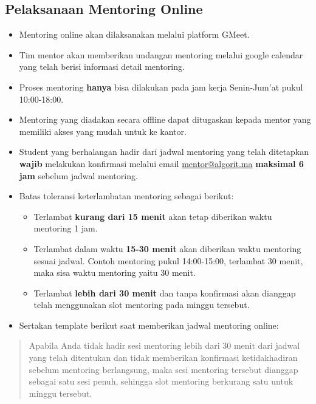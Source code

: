 \documentclass[
]{book}
\providecommand{\tightlist}{%
  \setlength{\itemsep}{0pt}\setlength{\parskip}{0pt}}
\begin{document}
\hypertarget{pelaksanaan-mentoring-online}{%
\subsection{Pelaksanaan Mentoring Online}\label{pelaksanaan-mentoring-online}}

\begin{itemize}
\item
  Mentoring online akan dilaksanakan melalui platform GMeet.
\item
  Tim mentor akan memberikan undangan mentoring melalui google calendar yang telah berisi informasi detail mentoring.
\item
  Proses mentoring \textbf{hanya} bisa dilakukan pada jam kerja Senin-Jum'at pukul 10:00-18:00.
\item
  Mentoring yang diadakan secara offline dapat ditugaskan kepada mentor yang memiliki akses yang mudah untuk ke kantor.
\item
  Student yang berhalangan hadir dari jadwal mentoring yang telah ditetapkan \textbf{wajib} melakukan konfirmasi melalui email \url{mentor@algorit.ma} \textbf{maksimal 6 jam} sebelum jadwal mentoring.
\item
  Batas toleransi keterlambatan mentoring sebagai berikut:

  \begin{itemize}
  \tightlist
  \item
    Terlambat \textbf{kurang dari 15 menit} akan tetap diberikan waktu mentoring 1 jam.
  \item
    Terlambat dalam waktu \textbf{15-30 menit} akan diberikan waktu mentoring sesuai jadwal. Contoh mentoring pukul 14:00-15:00, terlambat 30 menit, maka sisa waktu mentoring yaitu 30 menit.
  \item
    Terlambat \textbf{lebih dari 30 menit} dan tanpa konfirmasi akan dianggap telah menggunakan slot mentoring pada minggu tersebut.
  \end{itemize}
\item
  Sertakan template berikut saat memberikan jadwal mentoring online:
\end{itemize}

\begin{quote}
Apabila Anda tidak hadir sesi mentoring lebih dari 30 menit dari jadwal yang telah ditentukan dan tidak memberikan konfirmasi ketidakhadiran sebelum mentoring berlangsung, maka sesi mentoring tersebut dianggap sebagai satu sesi penuh, sehingga slot mentoring berkurang satu untuk minggu tersebut.
\end{quote}
\end{document}
